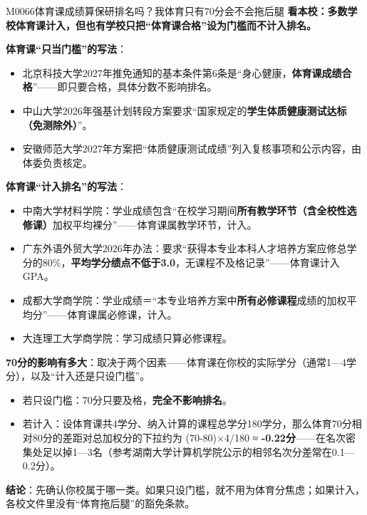 \begin{qa}{M0066}{体育课成绩算保研排名吗？我体育只有70分会不会拖后腿}
\textbf{看本校：多数学校体育课计入，但也有学校只把“体育课合格”设为门槛而不计入排名。}

\textbf{体育课“只当门槛”的写法}：
\begin{itemize}
  \item 北京科技大学2027年推免通知的基本条件第6条是“身心健康，\textbf{体育课成绩合格}”——即只要合格，具体分数不影响排名。
  \item 中山大学2026年强基计划转段方案要求“国家规定的\textbf{学生体质健康测试达标（免测除外）}”。
  \item 安徽师范大学2027年方案把“体质健康测试成绩”列入复核事项和公示内容，由体委负责核定。
\end{itemize}

\textbf{体育课“计入排名”的写法}：
\begin{itemize}
  \item 中南大学材料学院：学业成绩包含“在校学习期间\textbf{所有教学环节（含全校性选修课）}加权平均裸分”——体育课属教学环节，计入。
  \item 广东外语外贸大学2026年办法：要求“获得本专业本科人才培养方案应修总学分的80\%，\textbf{平均学分绩点不低于3.0}，无课程不及格记录”——体育课计入GPA。
  \item 成都大学商学院：学业成绩＝“本专业培养方案中\textbf{所有必修课程}成绩的加权平均分”——体育课属必修课，计入。
  \item 大连理工大学商学院：学习成绩只算必修课程。
\end{itemize}

\textbf{70分的影响有多大}：取决于两个因素——体育课在你校的实际学分（通常1—4学分），以及“计入还是只设门槛”。
\begin{itemize}
  \item 若只设门槛：70分只要及格，\textbf{完全不影响排名}。
  \item 若计入：设体育课共4学分、纳入计算的课程总学分180学分，那么体育70分相对80分的差距对总加权分的下拉约为 (70-80)×4/180 ≈ \textbf{-0.22分}——在名次密集处足以掉1—3名（参考湖南大学计算机学院公示的相邻名次分差常在0.1—0.2分）。
\end{itemize}

\textbf{结论}：先确认你校属于哪一类。如果只设门槛，就不用为体育分焦虑；如果计入，各校文件里没有“体育拖后腿”的豁免条款。
\end{qa}

